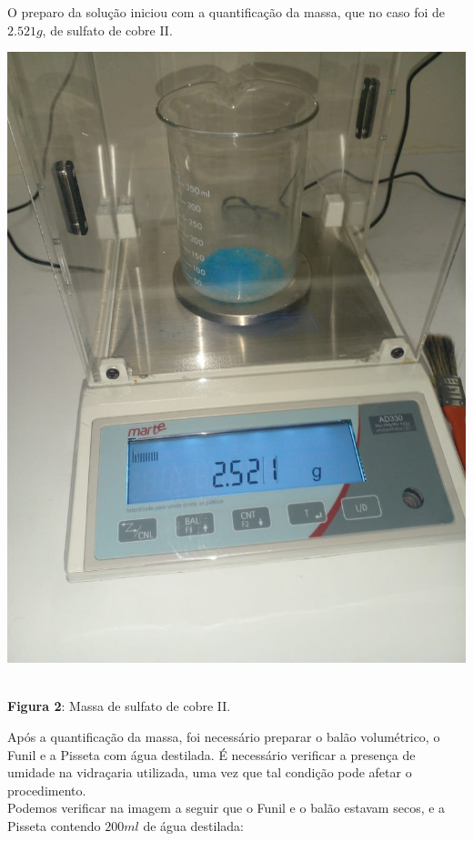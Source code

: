 \documentclass[a4paper, 11pt]{article}
\begin{document}
        \indent O preparo da solução iniciou com a quantificação da massa, que no caso foi de $2.521g$, de sulfato de cobre II\@.\\
        \begin{center}
            \parbox{7cm}{\includegraphics[scale=0.2]{02. massa_utilizada.jpeg}}\\
            \singlespacing
            \textbf{Figura 2}: Massa de sulfato de cobre II\@.
        \end{center}
        \doublespacing

        \indent Após a quantificação da massa, foi necessário preparar o balão volumétrico, o Funil e a Pisseta com água destilada\@.
        É necessário verificar a presença de umidade na vidraçaria utilizada, uma vez que tal condição pode afetar o procedimento\@.\\
        Podemos verificar na imagem a seguir que o Funil e o balão estavam secos, e a Pisseta contendo $200ml$ de água destilada\@:
\end{document}
